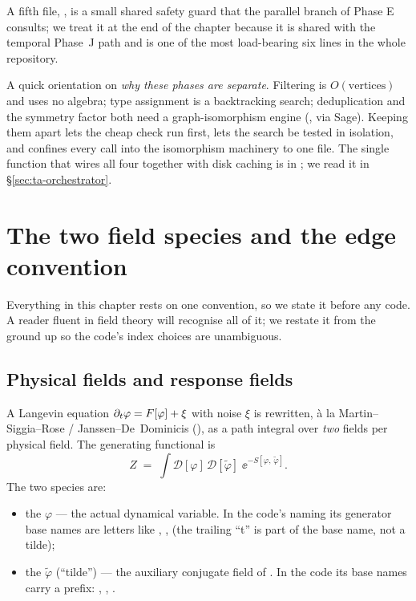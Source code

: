 A fifth file, , is a small shared safety guard that
the parallel branch of Phase E consults; we treat it at the end of the chapter
because it is shared with the temporal Phase~J path and is one of the most
load-bearing six lines in the whole repository.

\begin{note}
A quick orientation on \emph{why these phases are separate}. Filtering is
$O(\text{vertices})$ and uses no algebra; type assignment is a backtracking
search; deduplication and the symmetry factor both need a graph-isomorphism
engine (, via Sage). Keeping them apart lets the cheap check run
first, lets the search be tested in isolation, and confines every call into the
isomorphism machinery to one file. The single function that wires all four
together with disk caching is
 in ; we read it in
\S\ref{sec:ta-orchestrator}.
\end{note}

\section{The two field species and the edge convention}\label{sec:ta-convention}

Everything in this chapter rests on one convention, so we state it before any
code. A reader fluent in \msrjd{} field theory will recognise all of it; we
restate it from the ground up so the code's index choices are unambiguous.

\subsection{Physical fields and response fields}

A Langevin equation $\partial_t\varphi = F[\varphi] + \xi$ with noise $\xi$ is rewritten,
\`a la Martin--Siggia--Rose / Janssen--De~Dominicis (\msrjd{}), as a path integral
over \emph{two} fields per physical field. The generating functional is
\begin{equation}
  Z \;=\; \int \mathcal{D}[\varphi]\,\mathcal{D}[\tilde\varphi]\;
  \ee^{-S[\varphi,\,\tilde\varphi]} .
  \label{eq:ta-Z}
\end{equation}
The two species are:

\begin{itemize}
  \item the  $\varphi$ --- the actual dynamical variable. In
        the code's naming its generator base names are letters like ,
        ,  (the trailing ``t'' is part of the base name, not a
        tilde);
  \item the  $\tilde\varphi$ (``tilde'') --- the auxiliary
        conjugate field of \msrjd{}. In the code its base names carry a 
        prefix: , , .
\end{itemize}

